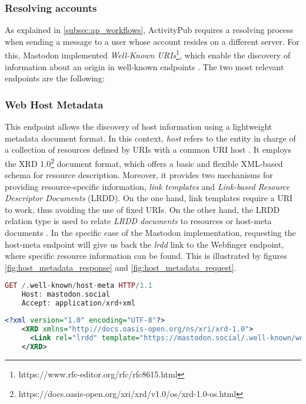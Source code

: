 \subsubsection*{\textbf{Resolving accounts}}
As explained in \ref{subsec:ap_workflows}, ActivityPub requires a resolving process when sending a message to a user whose account resides on a different server. For this, Mastodon implemented \emph{Well-Known URIs}\footnote{https://www.rfc-editor.org/rfc/rfc8615.html}, which enable the discovery of information about an origin in well-known endpoints \cite{nottingham_2019}. The two most relevant endpoints are the following: 

\subsubsection*{Web Host Metadata}
This endpoint allows the discovery of host information using a lightweight metadata document format. In this context, \emph{host} refers to the entity in charge of a collection of resources defined by URIs with a common URI host \cite{cook_2011}. It employs the XRD 1.0\footnote{https://docs.oasis-open.org/xri/xrd/v1.0/os/xrd-1.0-os.html} document format, which offers a basic and flexible XML-based schema for resource description. Moreover, it provides two mechanisms for providing resource-specific information, \emph{link templates} and \emph{Link-based Resource Descriptor Documents} (LRDD). On the one hand, link templates require a URI to work, thus avoiding the use of fixed URIs. On the other hand, the LRDD relation type is used to relate \emph{LRDD documents} to resources or host-meta documents \cite{cook_2011}. In the specific case of the Mastodon implementation, requesting the host-meta endpoint will give us back the \emph{lrdd} link to the Webfinger endpoint, where specific resource information can be found. This is illustrated by figures \ref{fig:host_metadata_response} and \ref{fig:host_metadata_request}.

    \pagebreak
\lstset{style=JSONStyle}
\begin{lstlisting}[language=PHP, caption=Web Host Metadata request to mastodon.social, label=fig:host_metadata_request, float=ht]
    GET /.well-known/host-meta HTTP/1.1
    Host: mastodon.social
    Accept: application/xrd+xml
\end{lstlisting}

\lstset{style=JSONStyle}
\begin{lstlisting}[language=XML, caption=Web Host metadata response from mastodon.social, label=fig:host_metadata_response, float=h!]
    <?xml version="1.0" encoding="UTF-8"?>
    <XRD xmlns="http://docs.oasis-open.org/ns/xri/xrd-1.0">
      <Link rel="lrdd" template="https://mastodon.social/.well-known/webfinger?resource={uri}"/>
    </XRD>
\end{lstlisting}

